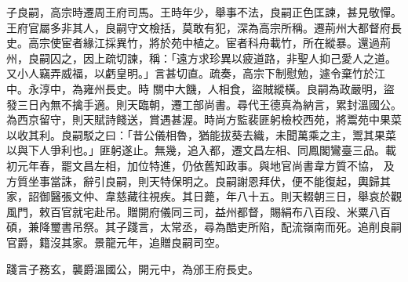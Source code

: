 \begin{pinyinscope}
 子良嗣，高宗時遷周王府司馬。王時年少，舉事不法，良嗣正色匡諫，甚見敬憚。王府官屬多非其人，良嗣守文檢括，莫敢有犯，深為高宗所稱。遷荊州大都督府長史。高宗使宦者緣江採異竹，將於苑中植之。宦者科舟載竹，所在縱暴。還過荊州，良嗣囚之，因上疏切諫，稱：「遠方求珍異以疲道路，非聖人抑己愛人之道。又小人竊弄威福，以虧皇明。」言甚切直。疏奏，高宗下制慰勉，遽令棄竹於江中。永淳中，為雍州長史。時
 關中大饑，人相食，盜賊縱橫。良嗣為政嚴明，盜發三日內無不擒手適。則天臨朝，遷工部尚書。尋代王德真為納言，累封溫國公。為西京留守，則天賦詩餞送，賞遇甚渥。時尚方監裴匪躬檢校西苑，將鬻苑中果菜以收其利。良嗣駁之曰：「昔公儀相魯，猶能拔葵去織，未聞萬乘之主，鬻其果菜以與下人爭利也。」匪躬遂止。無幾，追入都，遷文昌左相、同鳳閣鸞臺三品。載初元年春，罷文昌左相，加位特進，仍依舊知政事。與地官尚書韋方質不協，
 及方質坐事當誅，辭引良嗣，則天特保明之。良嗣謝恩拜伏，便不能復起，輿歸其家，詔御醫張文仲、韋慈藏往視疾。其日薨，年八十五。則天輟朝三日，舉哀於觀風門，敕百官就宅赴吊。贈開府儀同三司，益州都督，賜絹布八百段、米粟八百碩，兼降璽書吊祭。其子踐言，太常丞，尋為酷吏所陷，配流嶺南而死。追削良嗣官爵，籍沒其家。景龍元年，追贈良嗣司空。



 踐言子務玄，襲爵溫國公，開元中，為邠王府長史。




\end{pinyinscope}
